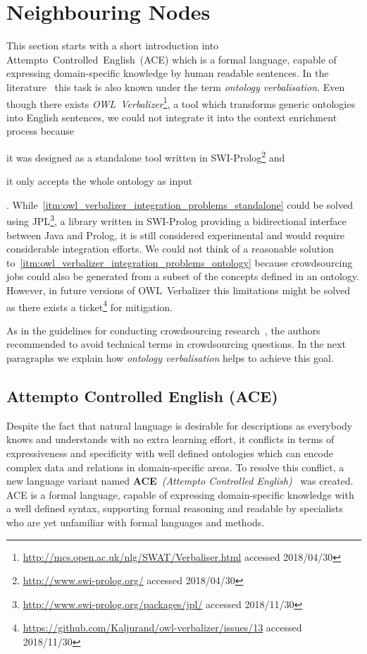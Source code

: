 \section{Neighbouring Nodes}\label{sec:neighboring_nodes}
This section starts with a short introduction into Attempto~Controlled~English~(ACE) which is a formal language, capable of expressing domain-specific knowledge by human readable sentences. In the literature~\cite{soton265735} this task is also known under the term \textit{ontology verbalisation}. Even though there exists \textit{OWL~Verbalizer}\footnote{\url{http://mcs.open.ac.uk/nlg/SWAT/Verbaliser.html} accessed 2018/04/30}, a tool which transforms generic ontologies into English sentences, we could not integrate it into the context enrichment process because 
\begin{inparaenum}[1)]
		\item \label{itm:owl_verbalizer_integration_problems_standalone} it was designed as a standalone tool written in SWI-Prolog\footnote{\url{http://www.swi-prolog.org/} accessed 2018/04/30} and
		\item \label{itm:owl_verbalizer_integration_problems_ontology} it only accepts the whole ontology as input
\end{inparaenum}. While~\ref{itm:owl_verbalizer_integration_problems_standalone} could be solved using JPL\footnote{\url{http://www.swi-prolog.org/packages/jpl/} accessed 2018/11/30}, a library written in SWI-Prolog providing a bidirectional interface between Java and Prolog, it is still considered experimental and would require considerable integration efforts. We could not think of a reasonable solution to~\ref{itm:owl_verbalizer_integration_problems_ontology} because crowdsourcing jobs could also be generated from a subset of the concepts defined in an ontology. However, in future versions of OWL~Verbalizer this limitations might be solved as there exists a ticket\footnote{\url{https://github.com/Kaljurand/owl-verbalizer/issues/13} accessed 2018/11/30} for mitigation. 

As in the guidelines for conducting crowdsourcing research~\cite{sarasua2015crowdsourcing}, the authors recommended to avoid technical terms in crowdsourcing questions. In the next paragraphs we explain how \textit{ontology verbalisation} helps to achieve this goal. 

\subsection{Attempto Controlled English (ACE)}
Despite the fact that natural language is desirable for descriptions as everybody knows and understands with no extra learning effort, it conflicts in terms of expressiveness and specificity with well defined ontologies which can encode complex data and relations in domain-specific areas. To resolve this conflict, a new language variant named \textbf{ACE}~\textit{(Attempto Controlled English)}~\cite{fuchs2008} was created. ACE is a formal language, capable of expressing domain-specific knowledge with a well defined syntax, supporting formal reasoning and readable by specialists who are yet unfamiliar with formal languages and methods.

